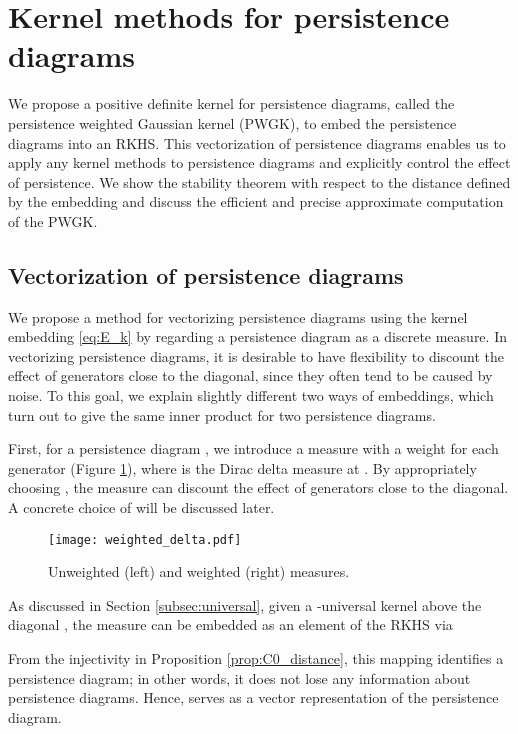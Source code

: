 \documentclass{article}
\begin{document}
\section{Kernel methods for persistence diagrams}
\label{sec:pdkernel}
We propose a positive definite kernel for persistence diagrams, called the persistence weighted Gaussian kernel (PWGK), to embed the persistence diagrams into an RKHS.
This vectorization of persistence diagrams enables us to apply any kernel methods to persistence diagrams and explicitly control the effect of persistence.
We show the stability theorem with respect to the distance defined by the embedding and discuss the efficient and precise approximate computation of the PWGK.   


\subsection{Vectorization of persistence diagrams}
\label{subsec:vectorization}

We propose a method for vectorizing persistence diagrams using the kernel embedding \eqref{eq:E_k} by regarding a persistence diagram as a discrete measure.
In vectorizing persistence diagrams, it is desirable to have flexibility to discount the effect of generators close to the diagonal, since they often tend to be caused by noise.
To this goal, we explain slightly different two ways of embeddings, which turn out to give the same inner product for two persistence diagrams. 

First, for a persistence diagram , we introduce a measure  with a weight  for each generator  (Figure \ref{fig:weighted}), where  is the Dirac delta measure at .
By appropriately choosing , the measure  can discount the effect of generators close to the diagonal.
A concrete choice of  will be discussed later.
\begin{figure}[htbp]
\begin{center}
\texttt{[image: weighted\_delta.pdf]}
\caption{Unweighted (left) and weighted (right) measures.}
\vspace{-3mm}
\label{fig:weighted}
\end{center}
\end{figure}

As discussed in Section \ref{subsec:universal}, given a -universal kernel  above the diagonal , the measure  can be embedded as an element of the RKHS  via 

From the injectivity in Proposition \ref{prop:C0_distance}, this mapping identifies a persistence diagram; in other words, it does not lose any information about persistence diagrams.
Hence,  serves as a vector representation of the persistence diagram.
\end{document}
